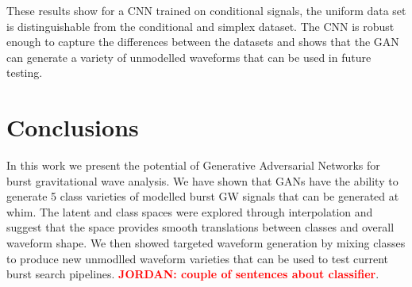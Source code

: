 \documentclass[12pt]{iopart}
\newcommand{\jordan}[1]{\textbf{\textcolor{red}{JORDAN: #1}}}
\begin{document}
These results show for a CNN trained on conditional signals, the uniform data set is distinguishable from the conditional and simplex dataset. The CNN is robust enough to capture the differences between the datasets and shows that the GAN can generate a variety of unmodelled waveforms that can be used in future testing. 

\section{Conclusions}
In this work we present the potential of Generative Adversarial Networks for burst gravitational wave analysis. We have shown that GANs have the ability to generate 5 class varieties of modelled burst \ac{GW} signals that can be generated at whim. The latent and class spaces were explored through interpolation and suggest that the space provides smooth translations between classes and overall waveform shape. We then showed targeted waveform generation by mixing classes to produce new unmodlled waveform varieties that can be used to test current burst search pipelines. \jordan{couple of sentences about classifier}. 
\end{document}
